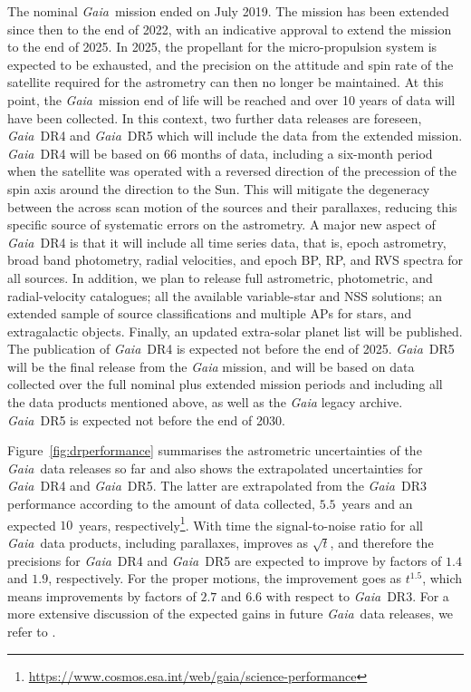\documentclass[longauth]{aa}
\newcommand\gaia{\textit{Gaia}\xspace}
\providecommand\gdr[1]{\textit{Gaia}~DR#1\xspace}
\providecommand\figrefalt[1]{Figure~\ref{#1}}
\begin{document}
The nominal \gaia\ mission ended on July 2019. The  mission  has been extended since then to the end of 2022, with an indicative approval to extend the mission to the end of 2025. In 2025, the propellant for the micro-propulsion system is expected to be exhausted, and the precision on the attitude and spin rate of the satellite required for the astrometry can then no longer be maintained. At this point, the \gaia\ mission end of life will be reached and  over 10 years of data will have been collected. In this context, two further data releases are foreseen, \gdr{4} and \gdr{5} which will include the data from the extended mission. \gdr{4} will be based on 66 months of data, including a six-month period when the satellite was operated with a reversed direction of the precession of the spin axis around the direction to the Sun. This will mitigate the degeneracy between the across scan motion of the sources and their parallaxes, reducing this specific source of systematic errors on the astrometry. A major new aspect of \gdr{4} is that it will include all time series data, that is, epoch astrometry, broad band photometry, radial velocities, and epoch BP, RP, and RVS spectra for all sources.  In addition,   we plan to release full astrometric, photometric, and radial-velocity catalogues; all the available variable-star and NSS solutions; an extended sample of  source classifications and multiple APs for stars, and extragalactic objects. Finally, an updated extra-solar planet list will be published. The publication of \gdr{4} is expected not before the end of 2025. \gdr{5} will be the final release from the {\gaia} mission, and will be based on data collected over the full nominal plus extended mission periods and including all the data products mentioned above, as well as the {\gaia} legacy archive. \gdr{5} is expected not before the end of 2030. 

\figrefalt{fig:drperformance} summarises the astrometric uncertainties of the \gaia\ data releases so far and also shows the extrapolated uncertainties for \gdr{4} and \gdr{5}. The latter are extrapolated from the \gdr{3} performance according to the amount of data collected, $5.5$~years and an expected $10$~years, respectively\footnote{\url{https://www.cosmos.esa.int/web/gaia/science-performance}}. With time the signal-to-noise ratio for all \gaia\ data products, including parallaxes, improves as $\sqrt{t}$, and therefore the precisions for \gdr{4} and \gdr{5} are expected to improve by  factors of $1.4$ and $1.9$, respectively. For the proper motions, the improvement goes as $t^{1.5}$, which means improvements by factors of $2.7$ and $6.6$ with respect to \gdr{3}. For a more extensive discussion of the expected gains in future \gaia\ data releases, we refer to \cite{2021ARA&A..59...59B}.
\end{document}
